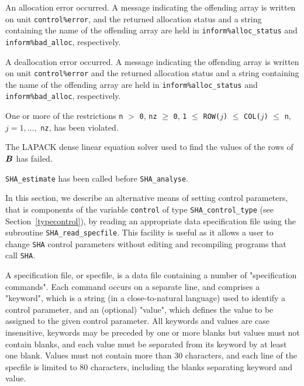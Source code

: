 \documentclass{galahad}
\newcommand{\packagename}{SHA}
\begin{document}
\begin{description}

 An allocation error occurred.
A message indicating the offending
array is written on unit {\tt control\%error}, and the returned allocation
status and a string containing the name of the offending array
are held in {\tt inform\%alloc\_\-status}
and {\tt inform\%bad\_alloc}, respectively.

 A deallocation error occurred.
A message indicating the offending
array is written on unit {\tt control\%error} and the returned allocation
status and a string containing the name of the offending array
are held in {\tt inform\%alloc\_\-status}
and {\tt inform\%bad\_alloc}, respectively.

One or more of the restrictions
{\tt n} $>$ {\tt 0},  {\tt nz} $\ge$ {\tt 0},
{\tt 1} $\le$ {\tt ROW(}$j${\tt )} $\le$ {\tt COL(}$j${\tt )} $\le$ {\tt n},
$j = 1, \ldots,$ {\tt nz},
has been violated.

The LAPACK dense linear equation solver used to find the values of
the rows of ${\bm{B}}$ has failed.

  {\tt \packagename\_estimate} has been called
before {\tt \packagename\_analyse}.

\end{description}


\galfeatures
\noindent In this section, we describe an alternative means of setting
control parameters, that is components of the variable {\tt control} of type
{\tt \packagename\_control\_type}
(see Section~\ref{typecontrol}),
by reading an appropriate data specification file using the
subroutine {\tt \packagename\_read\_specfile}. This facility
is useful as it allows a user to change  {\tt \packagename} control parameters
without editing and recompiling programs that call {\tt \packagename}.

A specification file, or specfile, is a data file containing a number of
"specification commands". Each command occurs on a separate line,
and comprises a "keyword",
which is a string (in a close-to-natural language) used to identify a
control parameter, and
an (optional) "value", which defines the value to be assigned to the given
control parameter. All keywords and values are case insensitive,
keywords may be preceded by one or more blanks but
values must not contain blanks, and
each value must be separated from its keyword by at least one blank.
Values must not contain more than 30 characters, and
each line of the specfile is limited to 80 characters,
including the blanks separating keyword and value.
\end{document}
